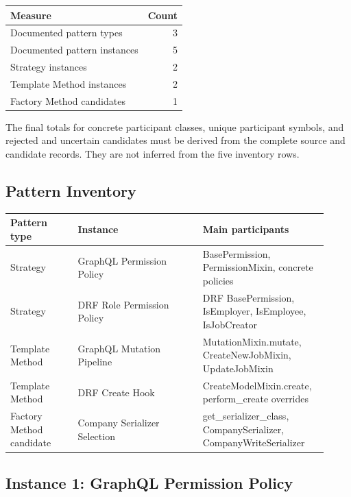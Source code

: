 \documentclass[11pt,a4paper]{article}
\begin{document}
\begin{center}
\begin{tabularx}{0.85\linewidth}{@{}Xr@{}}
\toprule
Measure & Count\\
\midrule
Documented pattern types & 3\\
Documented pattern instances & 5\\
Strategy instances & 2\\
Template Method instances & 2\\
Factory Method candidates & 1\\
\bottomrule
\end{tabularx}
\end{center}

The final totals for concrete participant classes, unique
participant symbols, and rejected and uncertain candidates
must be derived from the complete source and candidate
records. They are not inferred from the five inventory rows.

\subsection{Pattern Inventory}

\begin{longtable}{@{}p{0.20\linewidth}p{0.37\linewidth}p{0.35\linewidth}@{}}
\toprule
Pattern type & Instance & Main participants\\
\midrule
Strategy & GraphQL Permission Policy &
BasePermission, PermissionMixin, concrete policies\\

Strategy & DRF Role Permission Policy &
DRF BasePermission, IsEmployer, IsEmployee, IsJobCreator\\

Template Method & GraphQL Mutation Pipeline &
MutationMixin.mutate, CreateNewJobMixin, UpdateJobMixin\\

Template Method & DRF Create Hook &
CreateModelMixin.create, perform\_create overrides\\

Factory Method candidate & Company Serializer Selection &
get\_serializer\_class, CompanySerializer,
CompanyWriteSerializer\\
\bottomrule
\end{longtable}

\subsection{Instance 1: GraphQL Permission Policy}
\end{document}
